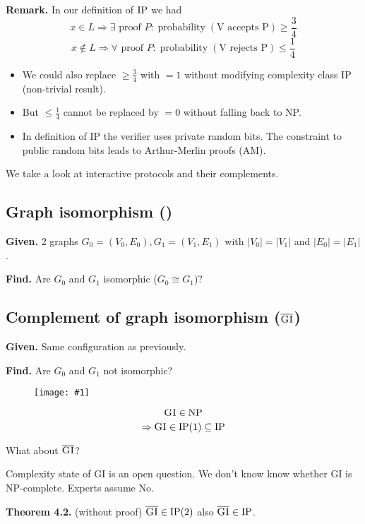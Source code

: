 \documentclass[a4paper]{article}
\newcommand{\drawing}[1]{%
 \begin{figure}[ht]
  \begin{center}
   \texttt{[image: \#1]}
  \end{center}
 \end{figure}
}
\newcommand{\given}[1]{\textbf{Given.} #1\par}
\newcommand{\find}[1]{\textbf{Find.} #1\par}
\newcommand{\cls}[1]{\rm{#1}}
\newcommand{\probl}[1]{\text{\textsc{#1}}}
\newenvironment{spec}[0]{\begin{framed}}{\end{framed}}
\DeclareMathOperator{\prop}{probability}
\begin{document}
\textbf{Remark.}
In our definition of $\cls{IP}$ we had
\[
  x \in L \Rightarrow \exists \text{ proof } P:
    \prop(\text{V accepts P}) \geq \frac34
\] \[
  x \notin L \Rightarrow \forall \text{ proof } P:
    \prop(\text{V rejects P}) \leq \frac14
\]

\begin{itemize}
  \item We could also replace $\geq \frac34$ with $=1$ without modifying
        complexity class \cls{IP} (non-trivial result).
  \item But $\leq \frac14$ cannot be replaced by $=0$ without falling
        back to \cls{NP}.
  \item In definition of \cls{IP} the verifier uses private random bits.
        The constraint to public random bits leads to Arthur-Merlin proofs
        (AM).
\end{itemize}
%
We take a look at interactive protocols and their complements.

\subsection{Graph isomorphism (\probl{GI})}
\label{sec:gi-ip}
%
\begin{spec}
  \given{
    2 graphs $G_0 = (V_0, E_0), G_1 = (V_1, E_1)$ with
    $|V_0| = |V_1|$ and $|E_0| = |E_1|$.
  }
  \find{Are $G_0$ and $G_1$ isomorphic ($G_0 \cong G_1$)?}
\end{spec}

\subsection{Complement of graph isomorphism ($\overline{\probl{GI}}$)}
\label{sec:gic-ip}
%
\begin{spec}
  \given{Same configuration as previously.}
  \find{Are $G_0$ and $G_1$ not isomorphic?}
\end{spec}

\drawing{graph_isomorphism.pdf}

\[
  \probl{GI} \in \cls{NP}
\] \[
  \Rightarrow \probl{GI} \in \cls{IP}(1) \subseteq \cls{IP}
\]

What about $\overline{\probl{GI}}$?

Complexity state of GI is an open question.
We don't know know whether GI is \cls{NP}-complete.
Experts assume No.

\textbf{Theorem 4.2.} (without proof)
  $\overline{\probl{GI}} \in \cls{IP}(2)$ also $\overline{\probl{GI}} \in \cls{IP}$.
\end{document}
